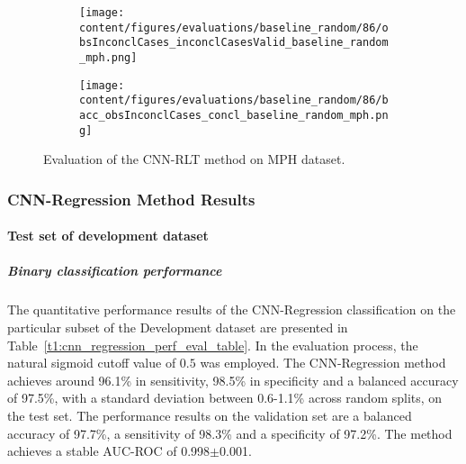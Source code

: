 \begin{figure}[ht]
  \begin{subfigure}{0.9\textwidth}
    \centering
    \texttt{[image: content/figures/evaluations/baseline\_random/86/obsInconclCases\_inconclCasesValid\_baseline\_random\_mph.png]}
    \label{fig:obsInconclCases_inconclCasesValid_baseline_random_mph}
  \end{subfigure}
  \hfill
  \begin{subfigure}{0.9\textwidth}
    \centering
    \texttt{[image: content/figures/evaluations/baseline\_random/86/bacc\_obsInconclCases\_concl\_baseline\_random\_mph.png]}
    \label{fig:bacc_obsInconclCases_concl_baseline_random_mph}
  \end{subfigure}
  \caption{Evaluation of the CNN-RLT method on MPH dataset.}
  \label{fig:perf_eval_rlt_mph}
\end{figure}


\subsubsection{CNN-Regression Method Results}
\label{subsubsec:eval_regression}


\paragraph{Test set of development dataset}


\subparagraph{Binary classification performance}

The quantitative performance results of the CNN-Regression classification on the 
particular subset of the Development dataset are presented in Table~\ref{t1:cnn_regression_perf_eval_table}.
In the evaluation process, the natural sigmoid cutoff value of $0.5$ was employed.
The CNN-Regression method achieves around 96.1\% in sensitivity, 98.5\% in specificity and a balanced accuracy of 97.5\%, 
with a standard deviation between 0.6-1.1\% across random splits, on the test set.
The performance results on the validation set are a balanced accuracy of 97.7\%, a sensitivity of 98.3\% 
and a specificity of 97.2\%.
The method achieves a stable AUC-ROC of 0.998$\pm$0.001.


